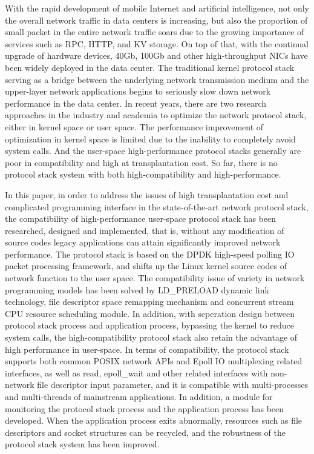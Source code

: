 \begin{eabstract}
With the rapid development of mobile Internet and artificial intelligence, not only the overall network traffic in data centers is increasing, but also the proportion of small packet in the entire network traffic soars due to the growing importance of services such as RPC, HTTP, and KV storage. On top of that, with the continual upgrade of hardware devices, 40Gb, 100Gb and other high-throughput NICs have been widely deployed in the data center. The traditional kernel protocol stack serving as a bridge between the underlying network transmission medium and the upper-layer network applications begins to seriously slow down network performance in the data center. In recent years, there are two research approaches in the industry and academia to optimize the network protocol stack, either in kernel space or user space. The performance improvement of optimization in kernel space is limited due to the inability to completely avoid system calls. And the user-space high-performance protocol stacks generally are poor in compatibility and high at transplantation cost. So far, there is no protocol stack system with both high-compatibility and high-performance.

In this paper, in order to address the issues of high transplantation cost and complicated programming interface in the state-of-the-art network protocol stack, the compatibility of high-performance user-space protocol stack has been researched, designed and implemented, that is, without any modification of source codes legacy applications can attain significantly improved network performance. The protocol stack is based on the DPDK high-speed polling IO packet processing framework, and shifts up the Linux kernel source codes of network function to the user space. The compatibility issue of variety in network programming models has been solved by LD\_PRELOAD dynamic link technology, file descriptor space remapping mechanism and concurrent stream CPU resource scheduling module. In addition, with seperation design between protocol stack process and application process, bypassing the kernel to reduce system calls, the high-compatibility protocol stack also retain the advantage of high performance in user-space. In terms of compatibility, the protocol stack supports both common POSIX network APIs and Epoll IO multiplexing related interfaces, as well as read, epoll\_wait and other related interfaces with non-network file descriptor input parameter, and it is compatible with multi-processes and multi-threads of mainstream applications. In addition, a module for monitoring the protocol stack process and the application process has been developed. When the application process exits abnormally, resources such as file descriptors and socket structures can be recycled, and the robustness of the protocol stack system has been improved.


\end{eabstract}
